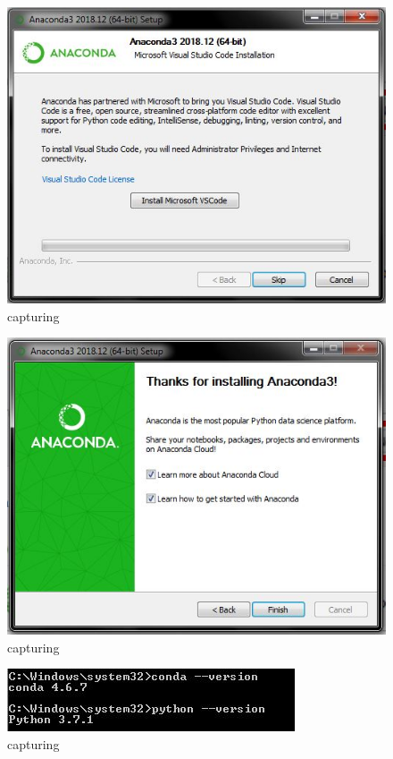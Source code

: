 \begin{enumerate}
\begin{itemize}
\begin{enumerate}
\begin{figure}[ht]
\centering
\includegraphics[scale=0.5]{figures/8.jpg}
\caption{capturing}
\label{proses instalasi}
\end{figure}

\begin{figure}[ht]
\centering
\includegraphics[scale=0.5]{figures/9.jpg}
\caption{capturing}
\label{proses instalasi}
\end{figure}

\begin{figure}[ht]
\centering
\includegraphics[scale=0.5]{figures/10.jpg}
\caption{capturing}
\label{proses instalasi}
\end{figure}


\end{enumerate}
\end{itemize}
\end{enumerate}
